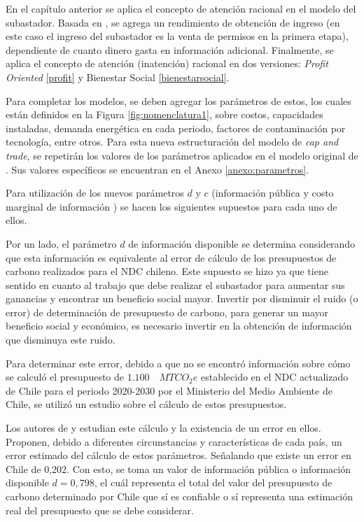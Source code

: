 En el capítulo anterior se aplica el concepto de atención racional en el modelo del subastador. Basada en \cite{dewan_estimating_2020}, se agrega un rendimiento de obtención de ingreso (en este caso el ingreso del subastador es la venta de permisos en la primera etapa), dependiente de cuanto dinero gasta en información adicional. Finalmente, se aplica el concepto de atención (inatención) racional en dos versiones: \textit{Profit Oriented} \ref{profit} y Bienestar Social \ref{bienestarsocial}. 
\vspace{2.5mm}

Para completar los modelos, se deben agregar los parámetros de estos, los cuales están definidos en la Figura \ref{fig:nomenclatura1}, sobre costos, capacidades instaladas, demanda energética en cada periodo, factores de contaminación por tecnología, entre otros. Para esta nueva estructuración del modelo de \textit{cap and trade}, se repetirán los valores de los parámetros aplicados en el modelo original de \cite{amigo_two_2021}. Sus valores específicos se encuentran en el Anexo \ref{anexo:parametros}.
\vspace{2.5mm}

Para utilización de los nuevos parámetros $d$ y $c$ (información pública y costo marginal de información ) se hacen los siguientes supuestos para cada uno de ellos.
\vspace{2.5mm}

Por un lado,  el parámetro $d$ de información disponible se determina considerando que esta información es equivalente al error de cálculo de los presupuestos de carbono realizados para el NDC chileno. Este supuesto se hizo ya que tiene sentido en cuanto al trabajo que debe realizar el subastador para aumentar sus ganancias y encontrar un beneficio social mayor. Invertir por disminuir el ruido (o error) de determinación de presupuesto de carbono, para generar un mayor beneficio social y económico, es necesario invertir en la obtención de información que disminuya este ruido. \vspace{2.5mm}

Para determinar este error, debido a que no se encontró información sobre cómo se calculó el presupuesto de $1.100\quad MTCO_{2}e$ establecido en el NDC actualizado de Chile para el periodo 2020-2030 por el Ministerio del Medio Ambiente de Chile, se utilizó un estudio sobre el cálculo de estos presupuestos.
\vspace{2.5mm}

Los autores de  y  estudian este cálculo y la existencia de un error en ellos. Proponen, debido a diferentes circunstancias y características de cada país, un error estimado del cálculo de estos parámetros. Señalando que existe un error en Chile de 0,202. Con esto, se toma un valor de información pública o información disponible $d=0,798$, el cuál representa el total del valor del presupuesto de carbono determinado por Chile que sí es confiable o sí representa una estimación real del presupuesto que se debe considerar.   
\vspace{2.5mm}

